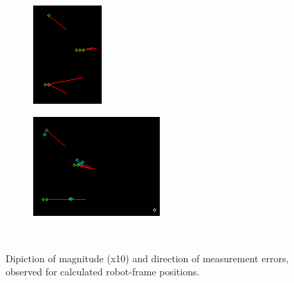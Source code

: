\documentclass[11pt,a4paper, margin=1in]{report}
\begin{document}
\begin{figure}[t]
	\centering
	\begin{subfigure}{0.45\linewidth}
		\includegraphics[width=\linewidth]{error2}
	\end{subfigure} %
	\begin{subfigure}{0.45\linewidth}
		\includegraphics[width=\linewidth]{error4}
	\end{subfigure}
	\caption{Dipiction of magnitude (x10) and direction of measurement errors, observed for calculated robot-frame positions.}	\
	\label{fig:error2}
\end{figure}
\end{document}
